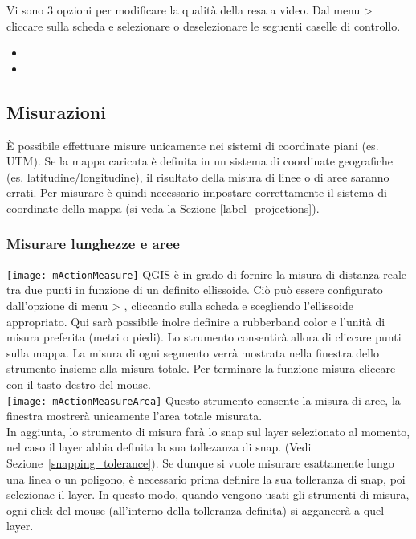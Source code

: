 \label{label_renderquality}

Vi sono 3 opzioni per modificare la qualità della resa a video. Dal menu
 >  cliccare sulla scheda
 e selezionare o deselezionare le seguenti caselle di controllo.

\begin{itemize}
\item {}
\item {}
\end{itemize}

\subsection{Misurazioni}\label{sec:measure}

È possibile effettuare misure unicamente nei sistemi di coordinate piani
(es. UTM). Se la mappa caricata è definita in un sistema di coordinate
geografiche (es. latitudine/longitudine), il risultato della misura di linee o
di aree saranno errati. Per misurare è quindi necessario impostare
correttamente il sistema di coordinate della mappa (si veda la Sezione \ref{label_projections}).

\subsubsection{Misurare lunghezze e aree}

\texttt{[image: mActionMeasure]} 
QGIS è in grado di fornire la misura di distanza reale tra due punti in
funzione di un definito ellissoide. Ciò può essere configurato dall'opzione di
menu  > , 
cliccando sulla scheda  e scegliendo l'ellissoide
appropriato. Qui sarà possibile inolre definire  a rubberband color e l'unità di misura preferita 
(metri o piedi). Lo strumento consentirà allora di cliccare punti sulla mappa.
La misura di ogni segmento verrà mostrata nella finestra dello strumento insieme alla misura totale. Per terminare la funzione misura cliccare con il
tasto destro del mouse. \\
\texttt{[image: mActionMeasureArea]} Questo strumento consente la
misura di aree, la finestra mostrerà unicamente l'area totale misurata. \\
In aggiunta, lo strumento di misura farà lo snap sul layer selezionato al momento, nel caso il layer abbia definita la sua tollezanza di snap. 
(Vedi Sezione~\ref{snapping_tolerance}). 
Se dunque si vuole misurare esattamente lungo una linea o un poligono, è necessario prima definire la sua tolleranza di snap, poi selezionae il layer. 
In questo modo, quando vengono usati gli strumenti di misura, ogni click del mouse (all'interno della tolleranza definita) si aggancerà a quel layer. 

